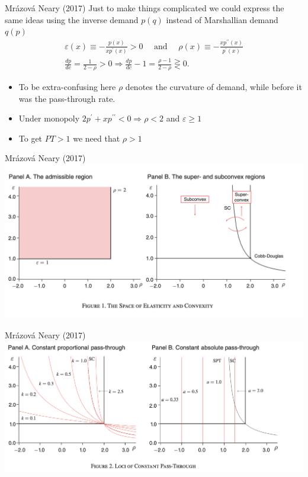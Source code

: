 \begin{frame}{Mrázová Neary (2017)}
Just to make things complicated we could express the same ideas using the \alert{inverse demand} $p(q)$ instead of \alert{Marshallian demand} $q(p)$
\begin{align*}
\varepsilon(x) \equiv-\frac{p(x)}{x p^{\prime}(x)}>0 \quad \text { and } \quad \rho(x) \equiv-\frac{x p^{\prime \prime}(x)}{p^{\prime}(x)}\\
\frac{d p}{d c}=\frac{1}{2-\rho}>0 \Rightarrow \frac{d p}{d c}-1=\frac{\rho-1}{2-\rho} \gtreqless 0 .
\end{align*}
\begin{itemize}
    \item To be extra-confusing here $\rho$ denotes the curvature of demand, while before it was the pass-through rate.
    \item Under monopoly $2 p^{\prime}+x p^{\prime \prime}<0 \Rightarrow \rho<2$ and $\varepsilon \geq 1$
    \item To get $PT > 1$ we need that $\rho > 1$
\end{itemize}
\end{frame}



\begin{frame}{Mrázová Neary (2017)}
\includegraphics[width=\textwidth]{resources/neary_3}
\end{frame}


\begin{frame}{Mrázová Neary (2017)}
\includegraphics[width=\textwidth]{resources/neary_2}
\end{frame}



